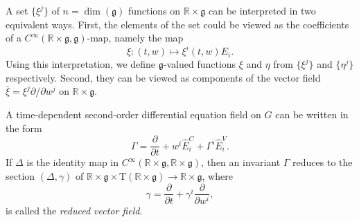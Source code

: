 \documentclass[11pt]{article}
\theoremstyle{plain}
\theoremstyle{definition}
\begin{document}
A set $\{\xi^j\}$ of $n=\dim(\mathfrak{g})$ functions on $\mathbb{R}\times \mathfrak{g}$ can be interpreted in two equivalent ways. First, the elements of the set could be viewed as the coefficients of a $C^{\infty}(\mathbb{R}\times \mathfrak{g},\mathfrak{g})$-map, namely the map
\begin{equation*}
    \xi\colon (t,w)\longmapsto \xi^i(t,w)E_i.
\end{equation*}
Using this interpretation, we define $\mathfrak{g}$-valued functions $\xi$ and $\eta$ from $\{\xi^j\}$ and $\{\eta^j\}$ respectively. Second, they can be viewed as components of the vector field $\bar{\xi}=\xi^j \partial/\partial w^j$ on $\mathbb{R}\times \mathfrak{g}$.

A time-dependent second-order differential equation field on $G$ can be written in the form
\begin{equation*}
    \Gamma=\frac{\partial}{\partial t}+w^i \widehat{E}_i^C+\Gamma^i \widehat{E}_i^V.
\end{equation*}
If $\Delta$ is the identity map in $C^{\infty}(\mathbb{R}\times \mathfrak{g},\mathbb{R}\times \mathfrak{g})$, then an invariant $\Gamma$ reduces to the section $(\Delta,\gamma)$ of $\mathbb{R}\times \mathfrak{g}\times \mathrm{T}(\mathbb{R}\times \mathfrak{g})\to \mathbb{R}\times \mathfrak{g}$, where
\begin{equation}\label{smallgamma}
    \gamma=\frac{\partial}{\partial t}+\gamma^i \frac{\partial}{\partial w^i},
\end{equation}
is called the \emph{reduced vector field}.
\end{document}
